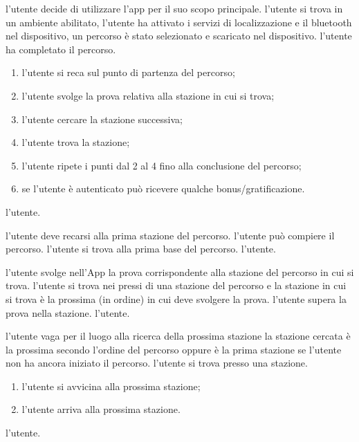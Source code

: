 
\desc l'utente decide di utilizzare l'app per il suo scopo principale.
\pre l'utente si trova in un ambiente abilitato, l'utente ha attivato i servizi di localizzazione e il bluetooth nel dispositivo, un percorso è stato selezionato e scaricato nel dispositivo.
\post l'utente ha completato il percorso.
\scen
  \begin{enumerate}
    \item \textbf{} l'utente si reca sul punto di partenza del percorso;
    \item \textbf{} l'utente svolge la prova relativa alla stazione in cui si trova;
    \item \textbf{} l'utente cercare la stazione successiva;
    \item \textbf{} l'utente trova la stazione;
    \item l'utente ripete i punti dal 2 al 4 fino alla conclusione del percorso;
    \item \textbf{} se l'utente è autenticato può ricevere qualche bonus/gratificazione.
  \end{enumerate}
\att l'utente.

\desc l'utente deve recarsi alla prima stazione del percorso.
\pre l'utente può compiere il percorso.
\post l'utente si trova alla prima base del percorso.
\att l'utente.

\desc l'utente svolge nell'App la prova corrispondente alla stazione del percorso in cui si trova.
\pre l'utente si trova nei pressi di una stazione del percorso e la stazione in cui si trova è la prossima (in ordine) in cui deve svolgere la prova.
\post l'utente supera la prova nella stazione.
\att l'utente.

\desc l'utente vaga per il luogo alla ricerca della prossima stazione
\pre la stazione cercata è la prossima secondo l'ordine del percorso oppure è la prima stazione se l'utente non ha ancora iniziato il percorso.
\post l'utente si trova presso una stazione.
\scen
\begin{enumerate}
  \item \textbf{} l'utente si avvicina alla prossima stazione;
  \item \textbf{} l'utente arriva alla prossima stazione.
\end{enumerate}
\att l'utente.

